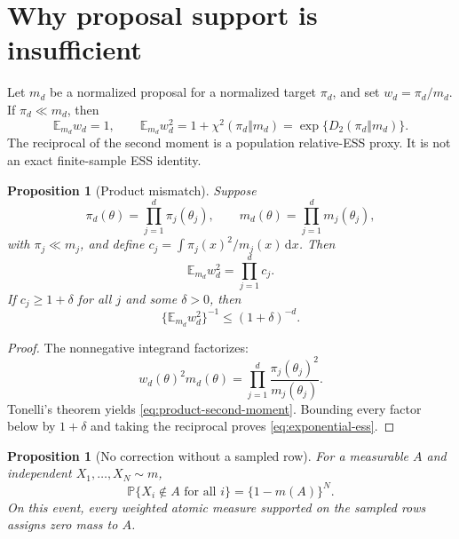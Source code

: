 \documentclass[11pt]{article}
\newtheorem{proposition}[theorem]{Proposition}
\theoremstyle{definition}
\theoremstyle{remark}
\newcommand{\E}{\mathbb{E}}
\newcommand{\Prob}{\mathbb{P}}
\newcommand{\1}{\mathbf{1}}
\newcommand{\dd}{\,\mathrm{d}}
\begin{document}
\section{Why proposal support is insufficient}

Let $m_d$ be a normalized proposal for a normalized target $\pi_d$, and set
$w_d=\pi_d/m_d$.  If $\pi_d\ll m_d$, then
\begin{equation}
 \E_{m_d}w_d=1,
 \qquad
 \E_{m_d}w_d^2
 =1+\chi^2(\pi_d\Vert m_d)
 =\exp\{D_2(\pi_d\Vert m_d)\}.
 \label{eq:weight-second-moment}
\end{equation}
The reciprocal of the second moment is a population relative-ESS proxy.  It is
not an exact finite-sample ESS identity.

\begin{proposition}[Product mismatch]
\label{prop:product-mismatch}
Suppose
\[
 \pi_d(\theta)=\prod_{j=1}^d\pi_j(\theta_j),
 \qquad
 m_d(\theta)=\prod_{j=1}^d m_j(\theta_j),
\]
with $\pi_j\ll m_j$, and define
$c_j=\int\pi_j(x)^2/m_j(x)\dd x$.  Then
\begin{equation}
 \E_{m_d}w_d^2=\prod_{j=1}^d c_j.
 \label{eq:product-second-moment}
\end{equation}
If $c_j\geq1+\delta$ for all $j$ and some $\delta>0$, then
\begin{equation}
 \{\E_{m_d}w_d^2\}^{-1}\leq(1+\delta)^{-d}.
 \label{eq:exponential-ess}
\end{equation}
\end{proposition}

\begin{proof}
The nonnegative integrand factorizes:
\[
 w_d(\theta)^2m_d(\theta)
 =\prod_{j=1}^d\frac{\pi_j(\theta_j)^2}{m_j(\theta_j)}.
\]
Tonelli's theorem yields \eqref{eq:product-second-moment}.  Bounding every
factor below by $1+\delta$ and taking the reciprocal proves
\eqref{eq:exponential-ess}.
\end{proof}

\begin{proposition}[No correction without a sampled row]
\label{prop:no-row-no-correction}
For a measurable $A$ and independent $X_1,\ldots,X_N\sim m$,
\begin{equation}
 \Prob\{X_i\notin A\text{ for all }i\}=\bigl\{1-m(A)\bigr\}^N.
 \label{eq:missing-region}
\end{equation}
On this event, every weighted atomic measure supported on the sampled rows
assigns zero mass to $A$.
\end{proposition}
\end{document}
